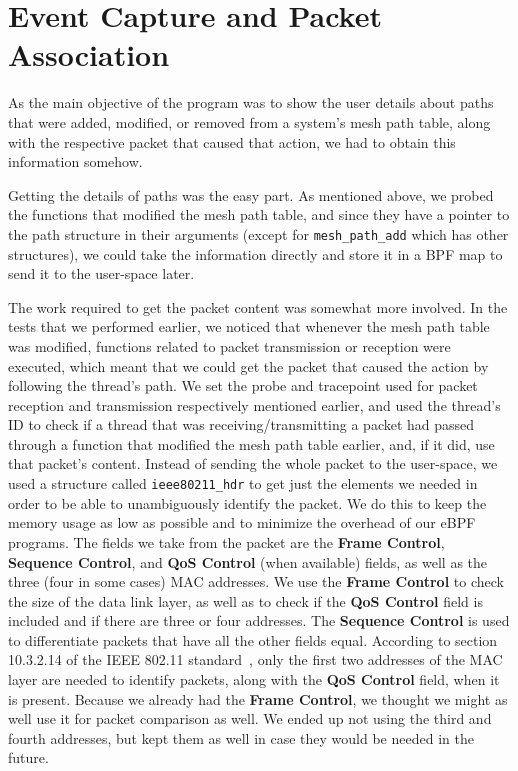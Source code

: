\section{Event Capture and Packet Association}\label{sect:evepktasc}

As the main objective of the program was to show the user details about paths
that were added, modified, or removed from a system's mesh path table, along
with the respective packet that caused that action, we had to obtain this
information somehow.

Getting the details of paths was the easy part. As mentioned above, we probed
the functions that modified the mesh path table, and since they have a pointer
to the path structure in their arguments (except for \texttt{mesh\_path\_add}
which has other structures), we could take the information directly and store it
in a BPF map to send it to the user-space later.

The work required to get the packet content was somewhat more involved. In the
tests that we performed earlier, we noticed that whenever the mesh path table
was modified, functions related to packet transmission or reception were
executed, which meant that we could get the packet that caused the action by
following the thread's path. We set the probe and tracepoint used for packet
reception and transmission respectively mentioned earlier, and used the thread's
ID to check if a thread that was receiving/transmitting a packet had passed
through a function that modified the mesh path table earlier, and, if it did,
use that packet's content. Instead of sending the whole packet to the
user-space, we used a structure called \texttt{ieee80211\_hdr} to get just the
elements we needed in order to be able to unambiguously identify the packet.
We do this to keep the memory usage as low as possible and to minimize the
overhead of our eBPF programs. The fields we take from the packet are the
\textbf{Frame Control}, \textbf{Sequence Control}, and \textbf{QoS Control}
(when available) fields, as well as the three (four in some cases) MAC
addresses. We use the \textbf{Frame Control} to check the size of the data link
layer, as well as to check if the \textbf{QoS Control} field is included and if
there are three or four addresses. The \textbf{Sequence Control} is used to
differentiate packets that have all the other fields equal. According to section
10.3.2.14 of the \ac{IEEE} 802.11 standard~\cite{ieee80211}, only the first two
addresses of the MAC layer are needed to identify packets, along with the
\textbf{QoS Control} field, when it is present. Because we already had the
\textbf{Frame Control}, we thought we might as well use it for packet comparison
as well. We ended up not using the third and fourth addresses, but kept them as
well in case they would be needed in the future.
